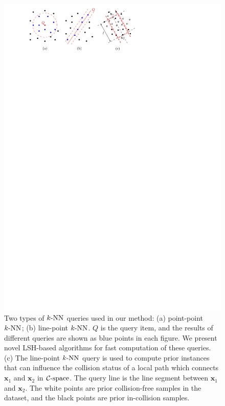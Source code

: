 \begin{figure}[htb]
  \centering
  \includegraphics[width=\linewidth]{figs/3/KNN.pdf}
  \caption[Two types of $\knn$ queries used in instance-based learning]{Two types of $\knn$ queries used in our method: (a) point-point $\knn$; (b) line-point $\knn$. $Q$ is the query item, and the results of different queries are shown as blue points in each figure. We present novel LSH-based algorithms for fast computation of these queries. (c) The line-point $\knn$ query is used to compute prior instances that can influence the collision status of a local path which connects $\mathbf x_1$ and $\mathbf x_2$ in $\mathcal C\text{-space}$. The query line is the line segment between $\mathbf x_1$ and $\mathbf x_2$. The white points are prior collision-free samples in the dataset, and the black points are prior in-collision samples.}
  \label{fig:3:KNN}
\end{figure}





